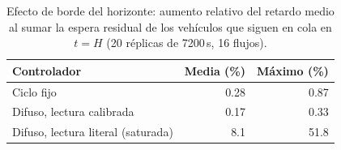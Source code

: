 \begin{table}[!t]
\caption{Efecto de borde del horizonte: aumento relativo del retardo medio al sumar la espera residual de los vehículos que siguen en cola en $t=H$ (20 réplicas de 7200\,s, 16 flujos).}
\label{tab:borde}
\centering
\footnotesize
\begin{tabular}{@{}lrr@{}}
\toprule
Controlador & Media (\%) & Máximo (\%) \\
\midrule
Ciclo fijo & 0.28 & 0.87 \\
Difuso, lectura calibrada & 0.17 & 0.33 \\
Difuso, lectura literal (saturada) & 8.1 & 51.8 \\
\bottomrule
\end{tabular}
\end{table}
